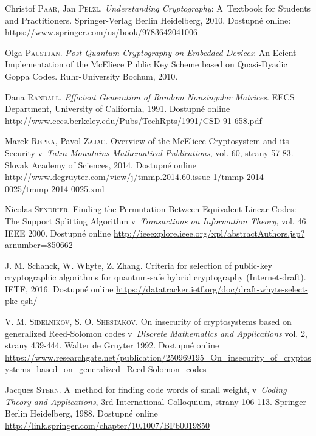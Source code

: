 \documentclass[thesis=M,czech,hidelinks]{FITthesis}[2012/06/26]
\newcommand{\0}{{\textcolor[gray]{0.80}{0}}}
\begin{document}
\begin{thebibliography}{99}
        Christof \textsc{Paar}, Jan \textsc{Pelzl}. \emph{Understanding
        Cryptography}: A~Textbook for Students and Practitioners.
        Springer-Verlag Berlin Heidelberg, 2010. Dostupné
        online: \url{https://www.springer.com/us/book/9783642041006}

        Olga \textsc{Paustjan}. \emph{Post Quantum Cryptography on Embedded
        Devices}: An Ecient Implementation of the McEliece Public Key Scheme
        based on Quasi-Dyadic Goppa Codes. Ruhr-University Bochum, 2010.


        Dana \textsc{Randall}. \emph{Efficient Generation of Random Nonsingular
        Matrices}. EECS Department, University of California, 1991. Dostupné
        online
        \url{http://www.eecs.berkeley.edu/Pubs/TechRpts/1991/CSD-91-658.pdf}

        Marek \textsc{Repka}, Pavol \textsc{Zajac}. Overview of the McEliece
        Cryptosystem and its Security v~\emph{Tatra Mountains Mathematical
        Publications}, vol. 60, strany 57-83. Slovak Academy of Sciences, 2014.
        Dostupné online
        \url{http://www.degruyter.com/view/j/tmmp.2014.60.issue-1/tmmp-2014-0025/tmmp-2014-0025.xml}

        Nicolas \textsc{Sendrier}. Finding the Permutation Between Equivalent
        Linear Codes: The Support Splitting Algorithm v~\emph{Transactions on
        Information Theory}, vol. 46. IEEE 2000. Dostupné online
        \url{http://ieeexplore.ieee.org/xpl/abstractAuthors.jsp?arnumber=850662}

        J. M. Schanck, W. Whyte, Z. Zhang. Criteria for selection of public-key
        cryptographic algorithms for quantum-safe hybrid cryptography
        (Internet-draft). IETF, 2016. Dostupné online
        \url{https://datatracker.ietf.org/doc/draft-whyte-select-pkc-qsh/}

        V. M. \textsc{Sidelnikov}, S. O. \textsc{Shestakov}. On insecurity of
        cryptosystems based on generalized Reed-Solomon codes v~\emph{Discrete
        Mathematics and Applications} vol. 2, strany 439-444. Walter de Gruyter
        1992. Dostupné online
        \url{https://www.researchgate.net/publication/250969195\_On\_insecurity\_of\_cryptosystems\_based\_on\_generalized\_Reed-Solomon\_codes}

        Jacques \textsc{Stern}. A~method for finding code words of small weight,
        v~\emph{Coding Theory and Applications}, 3rd International Colloquium,
        strany 106-113. Springer Berlin Heidelberg, 1988. Dostupné online
        \url{http://link.springer.com/chapter/10.1007/BFb0019850}


\end{thebibliography}
\end{document}
